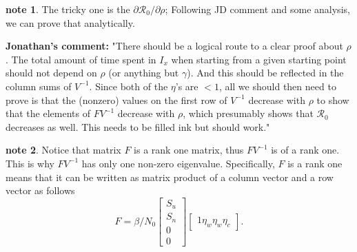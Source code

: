 \documentclass[12pt]{article}
\newcommand{\Rnum}{\mathcal{R}_0}
\theoremstyle{definition} %
\newtheorem{prop}{Proposition}
\newtheorem{note}{note}
\begin{document}
\begin{note} The tricky one is the $\partial{\Rnum}/\partial{\rho}$; Following JD comment and some analysis, we can prove that analytically.
\end{note}

{\bf Jonathan's comment:} "There should be a logical route to a clear proof about $\rho$. The total
amount of time spent in $I_x$ when starting from a given starting point should not depend on $\rho$ (or anything but $\gamma$). And this should be reflected in the column sums of $V^{-1}$.
Since both of the $\eta$'s are $<1$, all we should then need to prove is that the (nonzero) values on the first row of $V^{-1}$ decrease with $\rho$ to show that the elements of $FV^{-1}$ decrease with $\rho$, which presumably shows that $\Rnum$ decreases as well. This needs to be filled ink but should work."

\begin{note}
\label{note:rankf}
Notice that matrix $F$ is a rank one matrix, thus $FV^{-1}$ is of a rank one. This is why $FV^{-1}$ has only one non-zero eigenvalue. Specifically, $F$ is a rank one means that it can be written as matrix product of a column vector and a row vector as follows
$$
F = \beta/N_0 \left[\begin{array}{c} S_u\\  S_n\\ 0\\ 0 \end {array} \right]
\left[\begin{array}{cccc} 1 \eta_w \eta_w \eta_c \end {array} \right].
$$
\end{note}
% 
% 
% 
\end{document}
